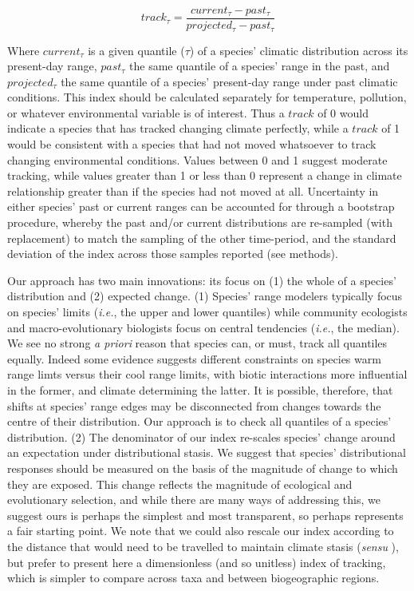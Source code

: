 \documentclass[12pt]{report}
\begin{document}
\begin{equation}
  track_\tau = \frac{current_\tau - past_\tau}{projected_\tau - past_\tau}
\end{equation}

Where $current_\tau$ is a given quantile ($\tau$) of a species'
climatic distribution across its present-day range, $past_\tau$ the
same quantile of a species' range in the past, and $projected_\tau$
the same quantile of a species' present-day range under past climatic
conditions. This index should be calculated separately for
temperature, pollution, or whatever environmental variable is of
interest. Thus a $track$ of 0 would indicate a species that has
tracked changing climate perfectly, while a $track$ of 1 would be
consistent with a species that had not moved whatsoever to track
changing environmental conditions. Values between 0 and 1 suggest
moderate tracking, while values greater than 1 or less than 0
represent a change in climate relationship greater than if the species
had not moved at all. Uncertainty in either species' past or current
ranges can be accounted for through a bootstrap procedure, whereby the
past and/or current distributions are re-sampled (with replacement) to
match the sampling of the other time-period, and the standard
deviation of the index across those samples reported (see methods).

Our approach has two main innovations: its focus on (1) the whole of a
species' distribution and (2) expected change. (1) Species' range modelers typically focus on species'
limits\supercite{Sexton2009} (\emph{i.e.}, the upper and lower
quantiles) while community ecologists \supercite{Tilman2004} and
macro-evolutionary \supercite{Zanne2018} biologists focus on central
tendencies (\emph{i.e.}, the median). We see no strong
\emph{a priori} reason that species can, or must, track all quantiles
equally. Indeed some evidence suggests different constraints on species
warm range limts versus their cool range limits, with biotic interactions more influential in the former,
and climate determining the latter\supercite{Freeman2018}.
It is possible, therefore, that shifts at species' range edges may be disconnected
from changes towards the centre of their distribution.
Our approach is to check all quantiles of a species' distribution. (2)
The denominator of our index re-scales species' change around an
expectation under distributional stasis. We suggest that species'
distributional responses should be measured on the basis of the
magnitude of change to which they are exposed. This change reflects
the magnitude of ecological and evolutionary selection, and while
there are many ways of addressing this, we suggest ours is perhaps the
simplest and most transparent, so perhaps represents a fair starting
point. We note that we could also rescale our index according to the
distance that would need to be travelled to maintain climate stasis
(\emph{sensu} \citeauthor{Loarie2009}\supercite{Loarie2009}), but
prefer to present here a dimensionless (and so unitless) index of
tracking, which is simpler to compare across taxa and between
biogeographic regions.
\end{document}
